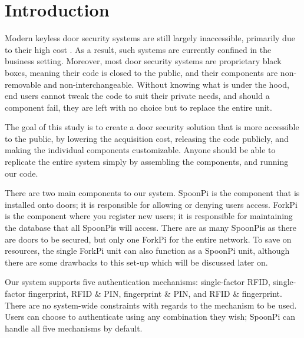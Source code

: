\section{Introduction}

Modern keyless door security systems are still largely inaccessible, primarily due to their high cost \cite{KeylessDoorProsCons}. As a result, such systems are currently confined in the business setting. Moreover, most door security systems are proprietary black boxes, meaning their code is closed to the public, and their components are non-removable and non-interchangeable. Without knowing what is under the hood, end users cannot tweak the code to suit their private needs, and should a component fail, they are left with no choice but to replace the entire unit.

The goal of this study is to create a door security solution that is more accessible to the public, by lowering the acquisition cost, releasing the code publicly, and making the individual components customizable. Anyone should be able to replicate the entire system simply by assembling the components, and running our code.

There are two main components to our system. SpoonPi is the component that is installed onto doors; it is responsible for allowing or denying users access. ForkPi is the component where you register new users; it is responsible for maintaining the database that all SpoonPis will access. There are as many SpoonPis as there are doors to be secured, but only one ForkPi for the entire network. To save on resources, the single ForkPi unit can also function as a SpoonPi unit, although there are some drawbacks to this set-up which will be discussed later on.

Our system supports five authentication mechanisms: single-factor RFID, single-factor fingerprint, RFID \& PIN, fingerprint \& PIN, and RFID \& fingerprint. There are no system-wide constraints with regards to the mechanism to be used. Users can choose to authenticate using any combination they wish; SpoonPi can handle all five mechanisms by default.

